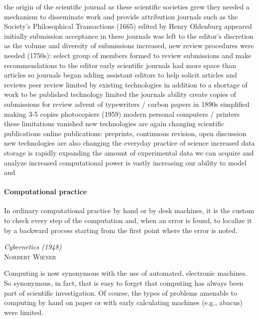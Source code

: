 \documentclass[ChapterTOCs,krantz2]{krantz} %
\begin{document}
    the origin of the scientific journal
        as these scientific societies grew they needed a mechanism to disseminate work and provide attribution
        journals such as the Society's Philosophical Transactions (1665) edited by Henry Oldenburg appeared
        initially submission acceptance in these journals was left to the editor's discretion
        as the volume and diversity of submissions increased, new review procedures were needed
            (1750s): select group of members formed to review submissions and make recommendations to the editor
        early scientific journals had more space than articles so journals began adding assistant editors to help solicit articles and reviews
    peer review limited by existing technologies
        in addition to a shortage of work to be published technology limited the journals ability create copies of submissions for review
            advent of typewriters / carbon papers in 1890s simplified making 3-5 copies
            photocopiers (1959)
            modern personal computers / printers these limitations vanished
    new technologies are again changing scientific publications
        online publications: preprints, continuous revision, open discussion
    new technologies are also changing the everyday practice of science
        increased data storage is rapidly expanding the amount of experimental data we can acquire and analyze
        increased computational power is vastly increasing our ability to model and



\paragraph{ {\bf Computational practice}}

\setlength{\epigraphrule}{0pt}
\setlength{\epigraphwidth}{.65\textwidth}
\epigraph%
{%
  In ordinary computational practice by hand or by desk machines, it
  is the custom to check every step of the computation and, when an
  error is found, to localize it by a backward process starting from
  the first point where the error is noted.
}%
{\textit{Cybernetics (1948)}\\ \textsc{Norbert Wiener} }

Computing is now synonymous with the use of automated, electronic machines.  So
synonymous, in fact, that is easy to forget that computing has always been part
of scientific investigation. Of course, the types of problems amenable to
computing by hand on paper or with early calculating machines (e.g., abacus)
were limited. 
\end{document}
